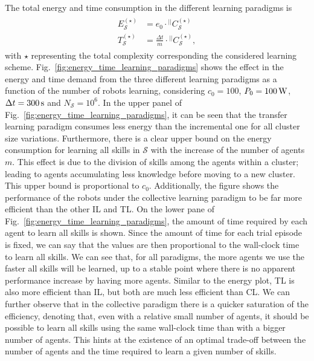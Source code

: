 The total energy and time consumption in the different learning paradigms is
\begin{align}
	\begin{split}
		E^{(\star)}_{\mathcal{S}} &= e_{0} \cdot {}^{\lvert \lvert}C_\mathcal{S}^{(\star)}\\
		T^{(\star)}_{\mathcal{S}} &= \frac{\Delta t}{m} \cdot {}^{\lvert \lvert}C_\mathcal{S}^{(\star)},
	\end{split}
\end{align}
with $ \star $ representing the total complexity corresponding the considered learning scheme. Fig.~\ref{fig:energy_time_learning_paradigms} shows the effect in the energy and time demand from the three different learning paradigms as a function of the number of robots learning, considering $c_0 = 100$, $P_0  = \unit[100]{W}$, $ \Delta t = \unit[300]{s}$ and $ N_\mathcal{S} = 10^6 $. In the upper panel of Fig.~\ref{fig:energy_time_learning_paradigms}, it can be seen that the transfer learning paradigm consumes less energy than the incremental one for all cluster size variations. Furthermore, there is a clear upper bound on the energy consumption for learning all skills in $\mathcal{S}$ with the increase of the number of agents $m$. This effect is due to the division of skills among the agents within a cluster; leading to agents accumulating less knowledge before moving to a new cluster. This upper bound is proportional to $c_0$. Additionally, the figure shows the performance of the robots under the collective learning paradigm to be far more efficient than the other IL and TL. On the lower pane  of Fig.~\ref{fig:energy_time_learning_paradigms}, the amount of time required by each agent to learn all skills is shown. Since the amount of time for each trial episode is fixed, we can say that the values are then proportional to the wall-clock time to learn all skills. We can see that, for all paradigms, the more agents we use the faster all skills will be learned, up to a stable point where there is no apparent performance increase by having more agents. Similar to the energy plot, TL is also more efficient than IL, but both are much less efficient than CL. We can further observe that in the collective paradigm there is a quicker saturation of the efficiency, denoting that, even with a relative small number of agents, it should be possible to learn all skills using the same wall-clock time than with a bigger number of agents. This hints at the existence of an optimal trade-off between the number of agents and the time required to learn a given number of skills.
